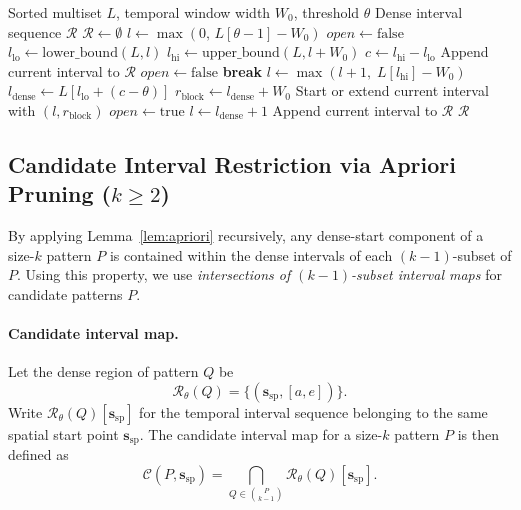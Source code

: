 \begin{algorithm}[t]
\caption{Duplicate-aware dense interval computation for a fixed spatial start point}
\label{alg:t_stride}
\begin{algorithmic}[1]
\Require Sorted multiset $L$, temporal window width $W_0$, threshold $\theta$
\Ensure Dense interval sequence $\mathcal{R}$
\State $\mathcal{R} \leftarrow \emptyset$
\State $l \leftarrow \max(0,\, L[\theta-1] - W_0)$
\State $\mathit{open} \leftarrow \mathrm{false}$
  \State $l_{\mathrm{lo}} \leftarrow \mathrm{lower\_bound}(L, l)$
  \State $l_{\mathrm{hi}} \leftarrow \mathrm{upper\_bound}(L, l + W_0)$
  \State $c \leftarrow l_{\mathrm{hi}} - l_{\mathrm{lo}}$
      \State Append current interval to $\mathcal{R}$
      \State $\mathit{open} \leftarrow \mathrm{false}$
    \EndIf
     \textbf{break} \EndIf
    \State $l \leftarrow \max(l+1,\; L[l_{\mathrm{hi}}] - W_0)$
  \Else
    \State $l_{\mathrm{dense}} \leftarrow L[l_{\mathrm{lo}} + (c-\theta)]$
    \State $r_{\mathrm{block}} \leftarrow l_{\mathrm{dense}} + W_0$
    \State Start or extend current interval with $(l, r_{\mathrm{block}})$
    \State $\mathit{open} \leftarrow \mathrm{true}$
    \State $l \leftarrow l_{\mathrm{dense}} + 1$
  \EndIf
\EndWhile
{}
  \State Append current interval to $\mathcal{R}$
\EndIf
\State \Return $\mathcal{R}$
\end{algorithmic}
\end{algorithm}

\subsection{Candidate Interval Restriction via Apriori Pruning ($k \geq 2$)}\label{sec:alg_k2}

By applying Lemma~\ref{lem:apriori} recursively,
any dense-start component of a size-$k$ pattern $P$
is contained within the dense intervals
of each $(k{-}1)$-subset of $P$.
Using this property,
we use \emph{intersections of $(k{-}1)$-subset interval maps}
for candidate patterns $P$.

\paragraph{Candidate interval map.}
Let the dense region of pattern $Q$ be
\[
  \mathcal{R}_\theta(Q)
  = \{(\bm{s}_{\mathrm{sp}}, [a,e])\}.
\]
Write $\mathcal{R}_\theta(Q)[\bm{s}_{\mathrm{sp}}]$
for the temporal interval sequence
belonging to the same spatial start point $\bm{s}_{\mathrm{sp}}$.
The candidate interval map for a size-$k$ pattern $P$ is then defined as
\begin{equation}\label{eq:candidate_cells}
  \mathcal{C}(P,\bm{s}_{\mathrm{sp}})
  =
  \bigcap_{Q \in \binom{P}{k-1}}
  \mathcal{R}_\theta(Q)[\bm{s}_{\mathrm{sp}}].
\end{equation}

